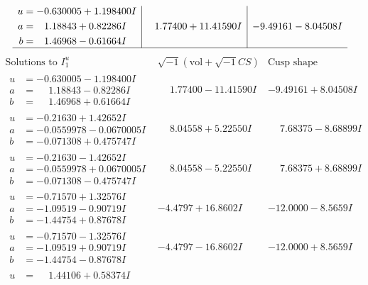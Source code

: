 \documentclass[1p]{elsarticle_modified}
\theoremstyle{definition}
\newcommand{\I}{\sqrt{-1}}
\begin{document}
$$\begin{array}{c|c|c}
\begin{aligned}
u &= -0.630005 + 1.198400 I \\
a &= \phantom{-}1.18843 + 0.82286 I \\
b &= \phantom{-}1.46968 - 0.61664 I\end{aligned}
 & \phantom{-}1.77400 + 11.41590 I & -9.49161 - 8.04508 I\\
 \hline 
 \end{array}$$\newpage$$\begin{array}{c|c|c}  
\text{Solutions to }I^u_{1}& \I (\text{vol} + \sqrt{-1}CS) & \text{Cusp shape}\\
 \hline 
\begin{aligned}
u &= -0.630005 - 1.198400 I \\
a &= \phantom{-}1.18843 - 0.82286 I \\
b &= \phantom{-}1.46968 + 0.61664 I\end{aligned}
 & \phantom{-}1.77400 - 11.41590 I & -9.49161 + 8.04508 I \\ \hline\begin{aligned}
u &= -0.21630 + 1.42652 I \\
a &= -0.0559978 - 0.0670005 I \\
b &= -0.071308 + 0.475747 I\end{aligned}
 & \phantom{-}8.04558 + 5.22550 I & \phantom{-}7.68375 - 8.68899 I \\ \hline\begin{aligned}
u &= -0.21630 - 1.42652 I \\
a &= -0.0559978 + 0.0670005 I \\
b &= -0.071308 - 0.475747 I\end{aligned}
 & \phantom{-}8.04558 - 5.22550 I & \phantom{-}7.68375 + 8.68899 I \\ \hline\begin{aligned}
u &= -0.71570 + 1.32576 I \\
a &= -1.09519 - 0.90719 I \\
b &= -1.44754 + 0.87678 I\end{aligned}
 & -4.4797 + 16.8602 I & -12.0000 - 8.5659 I \\ \hline\begin{aligned}
u &= -0.71570 - 1.32576 I \\
a &= -1.09519 + 0.90719 I \\
b &= -1.44754 - 0.87678 I\end{aligned}
 & -4.4797 - 16.8602 I & -12.0000 + 8.5659 I \\ \hline\begin{aligned}
u &= \phantom{-}1.44106 + 0.58374 I \\

\end{aligned}
\end{array}$$
\end{document}
